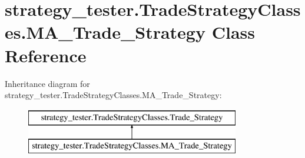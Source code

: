 \hypertarget{classstrategy__tester_1_1TradeStrategyClasses_1_1MA__Trade__Strategy}{\section{strategy\-\_\-tester.\-Trade\-Strategy\-Classes.\-M\-A\-\_\-\-Trade\-\_\-\-Strategy \-Class \-Reference}
\label{classstrategy__tester_1_1TradeStrategyClasses_1_1MA__Trade__Strategy}
}
\-Inheritance diagram for strategy\-\_\-tester.\-Trade\-Strategy\-Classes.\-M\-A\-\_\-\-Trade\-\_\-\-Strategy\-:\begin{figure}[H]
\begin{center}
\leavevmode
\includegraphics[height=2.000000cm]{classstrategy__tester_1_1TradeStrategyClasses_1_1MA__Trade__Strategy}
\end{center}
\end{figure}
